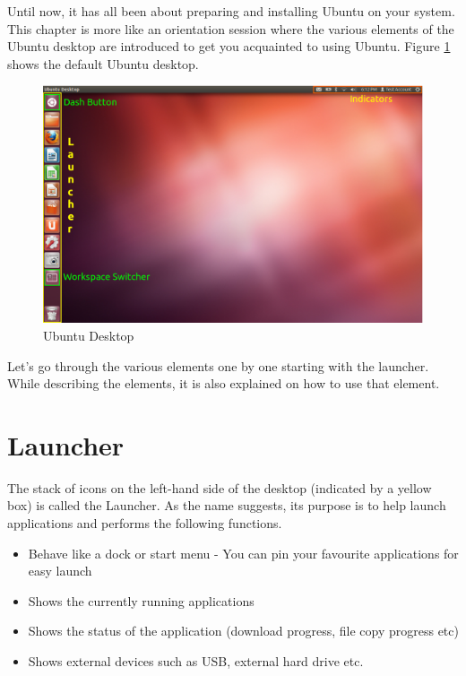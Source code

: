 Until now, it has all been about preparing and installing Ubuntu on your system. This chapter is more like an orientation session where the various elements of the Ubuntu desktop are introduced to get you acquainted to using Ubuntu. Figure \ref{fig:ubuntu-desktop1} shows the default Ubuntu desktop. \\

\begin{figure}[h]	
	\centering
	\includegraphics[width=400pt]{./images/desktop/desktop.png}
	\caption{Ubuntu Desktop}	
	\label{fig:ubuntu-desktop1}		
\end{figure}

\par \noindent Let's go through the various elements one by one starting with the launcher.  While describing the elements, it is also explained on how to use that element.

\section{Launcher} 
The stack of icons on the left-hand side of the desktop (indicated by a yellow box) is called the Launcher. As the name suggests, its purpose is to help launch applications and performs the following functions.

\begin{itemize}
	\item Behave like a dock or start menu - You can pin your favourite applications for easy launch
	\item Shows the currently running applications
	\item Shows the status of the application (download progress, file copy progress etc)
	\item Shows external devices such as USB, external hard drive etc.
\end{itemize}

